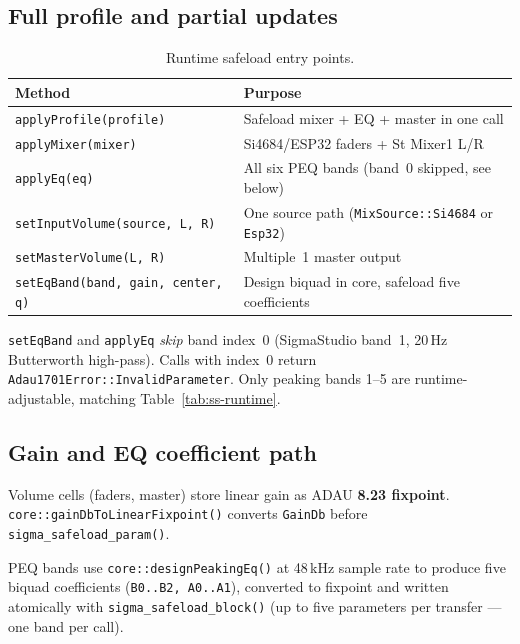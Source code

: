 \subsection{Full profile and partial updates}

\begin{table}[htbp]
  \centering
  \begin{tabular}{@{}L{4.2cm}L{9.2cm}@{}}
    \toprule
    \textbf{Method} & \textbf{Purpose} \\
    \midrule
    \texttt{applyProfile(profile)} &
      Safeload mixer + EQ + master in one call \\
    \texttt{applyMixer(mixer)} &
      Si4684/ESP32 faders + St Mixer1 L/R \\
    \texttt{applyEq(eq)} &
      All six PEQ bands (band~0 skipped, see below) \\
    \texttt{setInputVolume(source, L, R)} &
      One source path (\texttt{MixSource::Si4684} or \texttt{Esp32}) \\
    \texttt{setMasterVolume(L, R)} &
      Multiple~1 master output \\
    \texttt{setEqBand(band, gain, center, q)} &
      Design biquad in core, safeload five coefficients \\
    \bottomrule
  \end{tabular}
  \caption{Runtime safeload entry points.}
  \label{tab:adau1701-api}
\end{table}

\begin{drnote}
\texttt{setEqBand} and \texttt{applyEq} \emph{skip} band index~0 (SigmaStudio
band~1, 20\,Hz Butterworth high-pass). Calls with index~0 return
\texttt{Adau1701Error::InvalidParameter}. Only peaking bands 1--5 are
runtime-adjustable, matching Table~\ref{tab:ss-runtime}.
\end{drnote}

\subsection{Gain and EQ coefficient path}

Volume cells (faders, master) store linear gain as ADAU \textbf{8.23 fixpoint}.
\texttt{core::gainDbTo\-LinearFixpoint()} converts \texttt{GainDb} before
\texttt{sigma\_safeload\_param()}.

PEQ bands use \texttt{core::designPeakingEq()} at 48\,kHz sample rate to
produce five biquad coefficients (\texttt{B0..B2, A0..A1}), converted to
fixpoint and written atomically with \texttt{sigma\_safeload\_block()} (up to
five parameters per transfer --- one band per call).

